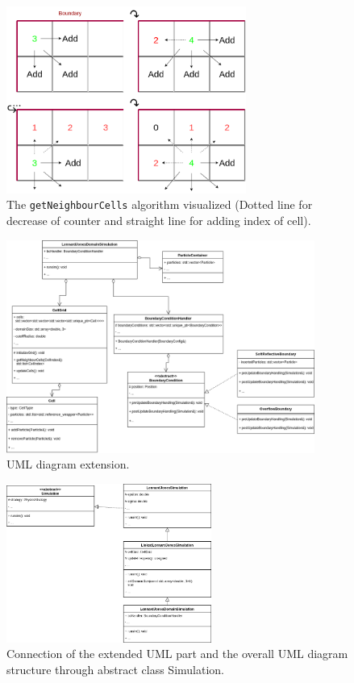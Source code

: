 \documentclass{article}
\begin{document}
\begin{figure}[H]
    \centering
    \includegraphics[width=0.7\textwidth]{res/getNeighbor.drawio}
    \caption{The \texttt{getNeighbourCells} algorithm visualized (Dotted line for decrease of counter and straight line for adding index of cell).}
    \label{fig:neighbor}
\end{figure}

\begin{figure}[H]
    \centering
    \includegraphics[width=0.9\textwidth]{res/UML3.drawio}
    \caption{UML diagram extension.}
    \label{fig:uml}
\end{figure}

\begin{figure}[H]
    \centering
    \includegraphics[width=0.6\textwidth]{res/UMLSimulation3.drawio}
    \caption{Connection of the extended UML part and the overall UML diagram structure through abstract class Simulation.}
    \label{fig:uml2}
\end{figure}
\end{document}
